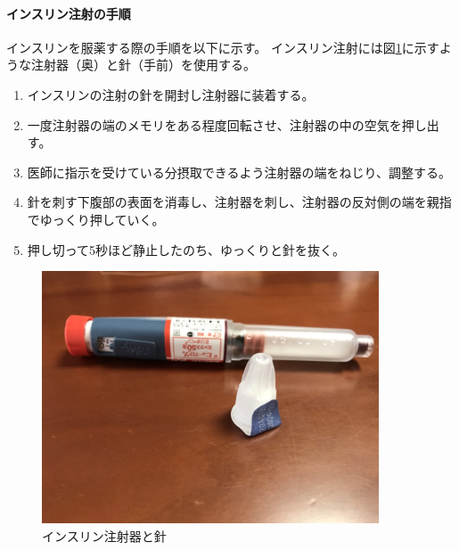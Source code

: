 \paragraph{インスリン注射の手順}
\label{paragraph:insulin_injection_steps}

インスリンを服薬する際の手順を以下に示す。
インスリン注射には図\ref{fig:insulin_pen_needle}に示すような注射器（奥）と針（手前）を使用する。

\begin{enumerate}
  \item インスリンの注射の針を開封し注射器に装着する。
  \item 一度注射器の端のメモリをある程度回転させ、注射器の中の空気を押し出す。
  \item 医師に指示を受けている分摂取できるよう注射器の端をねじり、調整する。
  \item 針を刺す下腹部の表面を消毒し、注射器を刺し、注射器の反対側の端を親指でゆっくり押していく。
  \item 押し切って5秒ほど静止したのち、ゆっくりと針を抜く。
\end{enumerate}

\begin{figure}[htbp]
  \caption{インスリン注射器と針}
  \label{fig:insulin_pen_needle}
  \begin{center}
    \includegraphics[bb=0 0 1300 1200,width=10cm]{assets/insulin_pen_needle.jpg}
  \end{center}
\end{figure}

